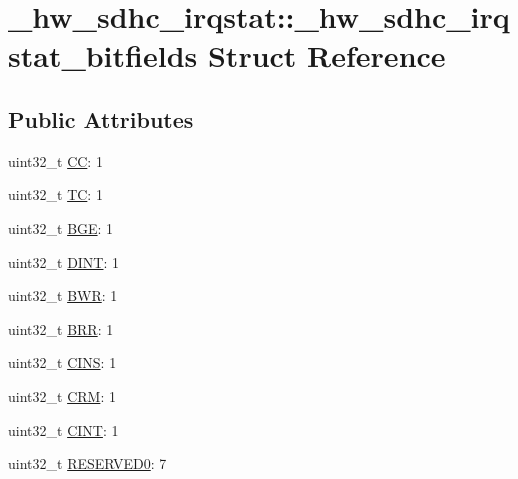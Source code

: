 \hypertarget{struct__hw__sdhc__irqstat_1_1__hw__sdhc__irqstat__bitfields}{}\section{\+\_\+hw\+\_\+sdhc\+\_\+irqstat\+:\+:\+\_\+hw\+\_\+sdhc\+\_\+irqstat\+\_\+bitfields Struct Reference}
\label{struct__hw__sdhc__irqstat_1_1__hw__sdhc__irqstat__bitfields}
\subsection*{Public Attributes}
\begin{DoxyCompactItemize}
\item 
uint32\+\_\+t \hyperlink{struct__hw__sdhc__irqstat_1_1__hw__sdhc__irqstat__bitfields_a03b4f6beb48af9f8a25ea01c3e34db44}{CC}\+: 1
\item 
uint32\+\_\+t \hyperlink{struct__hw__sdhc__irqstat_1_1__hw__sdhc__irqstat__bitfields_ac4cc8799054f3df04685bb60643a5af6}{TC}\+: 1
\item 
uint32\+\_\+t \hyperlink{struct__hw__sdhc__irqstat_1_1__hw__sdhc__irqstat__bitfields_a0fc5445e2c28fd917cba898d89bd609f}{B\+GE}\+: 1
\item 
uint32\+\_\+t \hyperlink{struct__hw__sdhc__irqstat_1_1__hw__sdhc__irqstat__bitfields_a489312aead50f1d75ea268363f7da193}{D\+I\+NT}\+: 1
\item 
uint32\+\_\+t \hyperlink{struct__hw__sdhc__irqstat_1_1__hw__sdhc__irqstat__bitfields_ad75a91f94de7a64dd80a797fca830cbd}{B\+WR}\+: 1
\item 
uint32\+\_\+t \hyperlink{struct__hw__sdhc__irqstat_1_1__hw__sdhc__irqstat__bitfields_a297a75e9d5a0b2fc3a929d9f04752776}{B\+RR}\+: 1
\item 
uint32\+\_\+t \hyperlink{struct__hw__sdhc__irqstat_1_1__hw__sdhc__irqstat__bitfields_aaad723c7323c9e76444dc14a568317d2}{C\+I\+NS}\+: 1
\item 
uint32\+\_\+t \hyperlink{struct__hw__sdhc__irqstat_1_1__hw__sdhc__irqstat__bitfields_af971167eac4cf3b0aaf3211d02eb6ba9}{C\+RM}\+: 1
\item 
uint32\+\_\+t \hyperlink{struct__hw__sdhc__irqstat_1_1__hw__sdhc__irqstat__bitfields_aa4608f3ffe6e2c78816610fd67b842c1}{C\+I\+NT}\+: 1
\item 
uint32\+\_\+t \hyperlink{struct__hw__sdhc__irqstat_1_1__hw__sdhc__irqstat__bitfields_aa166b262346017ec8d6e679b12d4aaf9}{R\+E\+S\+E\+R\+V\+E\+D0}\+: 7

\end{DoxyCompactItemize}
